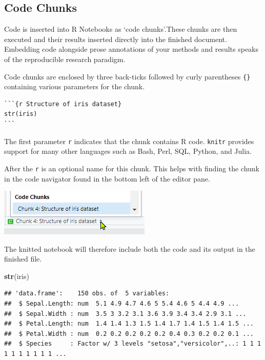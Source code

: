 \documentclass[]{article}
\newenvironment{Shaded}{\begin{snugshade}}{\end{snugshade}}
\newcommand{\KeywordTok}[1]{\textcolor[rgb]{0.13,0.29,0.53}{\textbf{#1}}}
\newcommand{\NormalTok}[1]{#1}
\begin{document}
\hypertarget{code-chunks}{%
\subsection{Code Chunks}\label{code-chunks}}

Code is inserted into R Notebooks as `code chunks'.These chunks are then
executed and their results inserted directly into the finished document.
Embedding code alongside prose annotations of your methods and results
speaks of the reproducible research paradigm.

Code chunks are enclosed by three back-ticks
\texttt{\textasciigrave{}\textasciigrave{}\textasciigrave{}} followed by
curly parentheses \texttt{\{\}} containing various parameters for the
chunk.

\begin{verbatim}
```{r Structure of iris dataset}
str(iris)
```
\end{verbatim}

The first parameter \texttt{r} indicates that the chunk contains R code.
\texttt{knitr} provides support for many other languages such as Bash,
Perl, SQL, Python, and Julia.

After the \texttt{r} is an optional name for this chunk. This helps with
finding the chunk in the code navigator found in the bottom left of the
editor pane.

\includegraphics{./namedchunk.png}

The knitted notebook will therefore include both the code and its output
in the finished file.

\begin{Shaded}
\begin{Highlighting}[]
\KeywordTok{str}\NormalTok{(iris)}
\end{Highlighting}
\end{Shaded}

\begin{verbatim}
## 'data.frame':    150 obs. of  5 variables:
##  $ Sepal.Length: num  5.1 4.9 4.7 4.6 5 5.4 4.6 5 4.4 4.9 ...
##  $ Sepal.Width : num  3.5 3 3.2 3.1 3.6 3.9 3.4 3.4 2.9 3.1 ...
##  $ Petal.Length: num  1.4 1.4 1.3 1.5 1.4 1.7 1.4 1.5 1.4 1.5 ...
##  $ Petal.Width : num  0.2 0.2 0.2 0.2 0.2 0.4 0.3 0.2 0.2 0.1 ...
##  $ Species     : Factor w/ 3 levels "setosa","versicolor",..: 1 1 1 1 1 1 1 1 1 1 ...
\end{verbatim}
\end{document}
